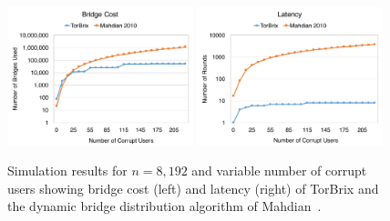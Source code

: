 \documentclass[letterpaper,twocolumn,10pt]{article}
\begin{document}
\begin{figure}[t]
	\hspace{-0.4em}
	\includegraphics[width=0.48\textwidth]{bridgeCost}	
	\hspace{1em}
	\includegraphics[width=0.48\textwidth]{latency}	
	\hspace{0.3em}
	\caption{Simulation results for ${n=8,192}$ and variable number of corrupt users showing bridge cost (left) and latency (right) of TorBrix and the dynamic bridge distribution algorithm of Mahdian~\cite{Mahdian:2010}.}
	\label{fig:plot1} 
\end{figure}

\end{document}
